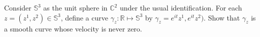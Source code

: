 Consider $\mathbb{S}^3$ as the unit sphere in $\mathbb{C}^2$ under the usual identification.  For each $z = (z^1, z^2) \in \mathbb{S}^3$, define a curve $\gamma_z:\mathbb{R} \mapsto \mathbb{S}^3$ by $\gamma_z = e^{it}z^1, e^{it} z^2)$.  Show that $\gamma_z$ is a smooth curve whose velocity is never zero.